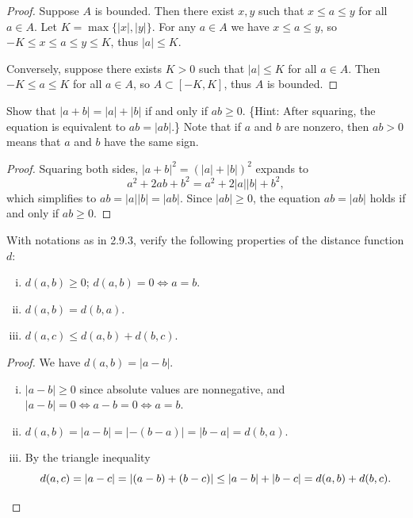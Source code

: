 \begin{proof}
    Suppose $A$ is bounded. Then there exist $x, y$ such that $x \leq a \leq y$ for all $a \in A$.
    Let $K = \max\{|x|, |y|\}$. For any $a \in A$ we have $x \leq a \leq y$, so $-K \leq x \leq a \leq y \leq K$, thus $|a| \leq K$.

    Conversely, suppose there exists $K > 0$ such that $|a| \leq K$ for all $a \in A$. 
    Then $-K \leq a \leq K$ for all $a \in A$, so $A \subset [-K, K]$, thus $A$ is bounded.
\end{proof}

\begin{tcolorbox}[title=Problem 3, breakable]
Show that $|a + b| = |a| + |b|$ if and only if $ab \geq 0$. \{Hint: After squaring, the equation is equivalent to $ab = |ab|$.\} Note that if $a$ and $b$ are nonzero, then $ab > 0$ means that $a$ and $b$ have the same sign.
\end{tcolorbox}

\begin{proof}
    Squaring both sides, $|a+b|^2 = (|a|+|b|)^2$ expands to
    \[a^2 + 2ab + b^2 = a^2 + 2|a||b| + b^2,\]
    which simplifies to $ab = |a||b| = |ab|$. Since $|ab| \geq 0$, the equation $ab = |ab|$ holds if and only if $ab \geq 0$.
\end{proof}

\begin{tcolorbox}[title=Problem 4, breakable]
With notations as in 2.9.3, verify the following properties of the distance function $d$:
\begin{enumerate}[(i)]
    \item $d(a,b) \geq 0$; $d(a,b) = 0 \Leftrightarrow a = b$.
    \item $d(a,b) = d(b,a)$.
    \item $d(a,c) \leq d(a,b) + d(b,c)$.
\end{enumerate}
\end{tcolorbox}

\begin{proof}
    We have $d(a,b) = |a - b|$.
    \begin{enumerate}[(i)]
        \item $|a - b| \geq 0$ since absolute values are nonnegative,
         and $|a - b| = 0 \Leftrightarrow a - b = 0 \Leftrightarrow a = b$.
        \item $d(a,b) = |a - b| = |-(b-a)| = |b - a| = d(b,a)$.
        \item By the triangle inequality
        \[d(a,c) = |a - c| = |(a-b)+(b-c)| \leq |a-b| + |b-c| = d(a,b) + d(b,c). \qedhere\]
    \end{enumerate}
\end{proof}

